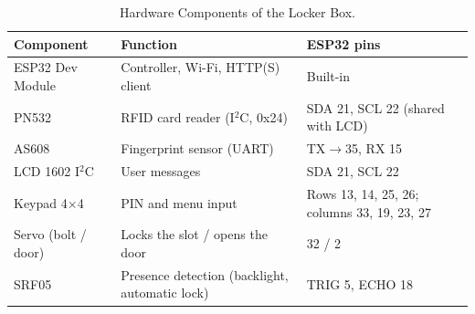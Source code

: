 \documentclass[journal,onecolumn]{IEEEtran}
\begin{document}
\begin{table}[!htbp]
\renewcommand{\arraystretch}{1.02}
\centering
\small
\caption{Hardware Components of the Locker Box.}
\label{tab:hw}
\vspace{5pt}
\begin{tabular}{l l l}
\hline
Component & Function & ESP32 pins \\
\hline
\rule{0pt}{2.6ex}ESP32 Dev Module & Controller, Wi-Fi, HTTP(S) client & Built-in \\
PN532 & RFID card reader (I$^2$C, 0x24) & SDA 21, SCL 22 (shared with LCD) \\
AS608 & Fingerprint sensor (UART) & TX$\rightarrow$35, RX 15 \\
LCD 1602 I$^2$C & User messages & SDA 21, SCL 22 \\
Keypad 4$\times$4 & PIN and menu input & Rows 13, 14, 25, 26; columns 33, 19, 23, 27 \\
Servo (bolt / door) & Locks the slot / opens the door & 32 / 2 \\
SRF05 & Presence detection (backlight, automatic lock) & TRIG 5, ECHO 18 \\
\hline
\end{tabular}
\end{table}
\end{document}
